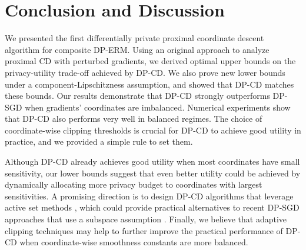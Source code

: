 

\section{Conclusion and Discussion}
\label{sec:conclusion-and-discussion}

We presented the first differentially private proximal coordinate descent
algorithm for composite DP-ERM.
Using an original approach to analyze proximal CD with perturbed
gradients, we derived optimal upper bounds on the privacy-utility trade-off
achieved by DP-CD. We also prove new lower bounds under a
component-Lipschitzness
assumption,
and showed that DP-CD matches these bounds.
Our results demonstrate that DP-CD strongly outperforms DP-SGD when
gradients' coordinates are imbalanced. Numerical experiments show that DP-CD
also performs very well in balanced regimes.
The choice of coordinate-wise clipping
thresholds is crucial for
DP-CD to achieve good utility in practice, and we provided a simple rule to
set them.



Although DP-CD already achieves good utility when most coordinates have small
sensitivity, our lower bounds suggest that even better utility could be
achieved by dynamically allocating more privacy budget to
coordinates with largest sensitivities.
A promising direction is to design DP-CD algorithms that leverage active set
methods
\citep{yuan2010Comparison,lewis2016Proximal,nutini2017Let,desantis2016Fast,Massias_Gramfort_Salmon18}, which could provide practical alternatives to recent DP-SGD approaches that use a
subspace assumption \citep{zhou2021Bypassing,kairouz2021Nearly}.
Finally, we believe that adaptive clipping techniques
\citep{pichapati2019AdaCliP,thakkar2019Differentially} may help to further
improve the practical performance of DP-CD when coordinate-wise
smoothness constants are more balanced.




